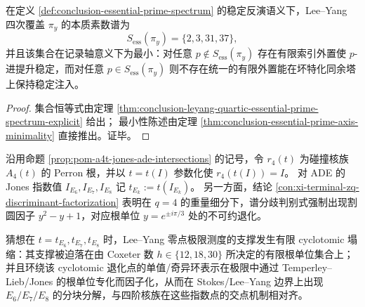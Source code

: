 \begin{corollary}\label{cor:conclusion-leyang-minimal-obstruction-primes}
在定义 \ref{def:conclusion-essential-prime-spectrum} 的稳定反演语义下，Lee--Yang 四次覆盖 \(\pi_y\) 的本质素数谱为
\[
S_{\mathrm{ess}}(\pi_y)=\{2,3,31,37\},
\]
并且该集合在记录轴意义下为最小：对任意 \(p\notin S_{\mathrm{ess}}(\pi_y)\) 存在有限索引外置使 \(p\)-进提升稳定，而对任意 \(p\in S_{\mathrm{ess}}(\pi_y)\) 则不存在统一的有限外置能在坏特化同余塔上保持稳定注入。
\end{corollary}
\begin{proof}
集合恒等式由定理 \ref{thm:conclusion-leyang-quartic-essential-prime-spectrum-explicit} 给出；
最小性陈述由定理 \ref{thm:conclusion-essential-prime-axis-minimality} 直接推出。证毕。
\end{proof}

\begin{conjecture}\label{conj:conclusion-ade-jones-leyang-cyclotomic-collapse}
沿用命题 \ref{prop:pom-a4t-jones-ade-intersections} 的记号，令 \(r_4(t)\) 为碰撞核族 \(A_4(t)\) 的 Perron 根，并以 \(t=t(I)\) 参数化使 \(r_4(t(I))=I\)。
对 ADE 的 Jones 指数值 \(I_{E_6},I_{E_7},I_{E_8}\) 记 \(t_{E_k}:=t(I_{E_k})\)。
另一方面，结论 \ref{con:xi-terminal-zq-discriminant-factorization} 表明在 \(q=4\) 的重量细分下，谱分歧判别式强制出现割圆因子 \(y^2-y+1\)，对应根单位 \(y=e^{\pm i\pi/3}\) 处的不可约退化。
\par
猜想在 \(t=t_{E_6},t_{E_7},t_{E_8}\) 时，Lee--Yang 零点极限测度的支撑发生有限 cyclotomic 塌缩：其支撑被迫落在由 Coxeter 数 \(h\in\{12,18,30\}\) 所决定的有限根单位集合上；并且环绕该 cyclotomic 退化点的单值/奇异环表示在极限中通过 Temperley--Lieb/Jones 的根单位专化而因子化，从而在 Stokes/Lee--Yang 边界上出现 \(E_6/E_7/E_8\) 的分块分解，与四阶核族在这些指数点的交点机制相对齐。
\end{conjecture}

\endinput

